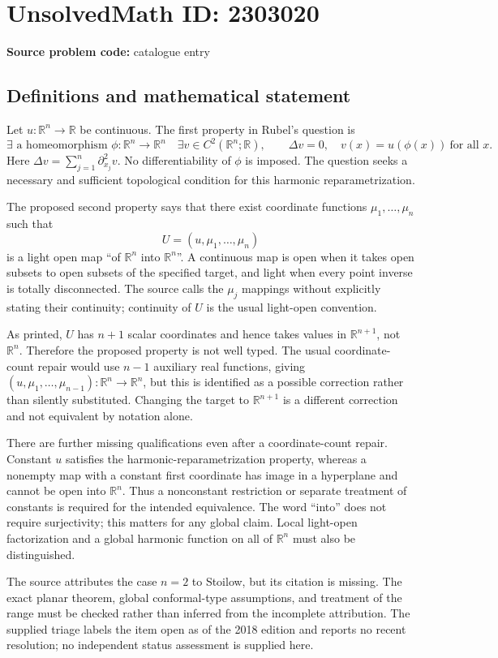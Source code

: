 \documentclass[11pt]{article}
\newcommand{\R}{\mathbb{R}}
\begin{document}
\section*{UnsolvedMath ID: 2303020}
\textbf{Source problem code:} catalogue entry
\subsection{Definitions and mathematical statement}
Let $u:\R^n\to\R$ be continuous. The first property in Rubel's question is
\[
\exists\text{ a homeomorphism }\phi:\R^n\to\R^n\quad
\exists v\in C^2(\R^n;\R),\qquad
\Delta v=0,\quad v(x)=u(\phi(x))\ \text{for all }x.
\]
Here $\Delta v=\sum_{j=1}^n\partial_{x_j}^2v$. No differentiability of $\phi$ is imposed. The question seeks a necessary and sufficient topological condition for this harmonic reparametrization.

The proposed second property says that there exist coordinate functions $\mu_1,\ldots,\mu_n$ such that
\[
U=(u,\mu_1,\ldots,\mu_n)
\]
is a light open map ``of $\R^n$ into $\R^n$''. A continuous map is open when it takes open subsets to open subsets of the specified target, and light when every point inverse is totally disconnected. The source calls the $\mu_j$ mappings without explicitly stating their continuity; continuity of $U$ is the usual light-open convention.

As printed, $U$ has $n+1$ scalar coordinates and hence takes values in $\R^{n+1}$, not $\R^n$. Therefore the proposed property is not well typed. The usual coordinate-count repair would use $n-1$ auxiliary real functions, giving $(u,\mu_1,\ldots,\mu_{n-1}):\R^n\to\R^n$, but this is identified as a possible correction rather than silently substituted. Changing the target to $\R^{n+1}$ is a different correction and not equivalent by notation alone.

There are further missing qualifications even after a coordinate-count repair. Constant $u$ satisfies the harmonic-reparametrization property, whereas a nonempty map with a constant first coordinate has image in a hyperplane and cannot be open into $\R^n$. Thus a nonconstant restriction or separate treatment of constants is required for the intended equivalence. The word ``into'' does not require surjectivity; this matters for any global claim. Local light-open factorization and a global harmonic function on all of $\R^n$ must also be distinguished.

The source attributes the case $n=2$ to Stoilow, but its citation is missing. The exact planar theorem, global conformal-type assumptions, and treatment of the range must be checked rather than inferred from the incomplete attribution. The supplied triage labels the item open as of the 2018 edition and reports no recent resolution; no independent status assessment is supplied here.
\end{document}
